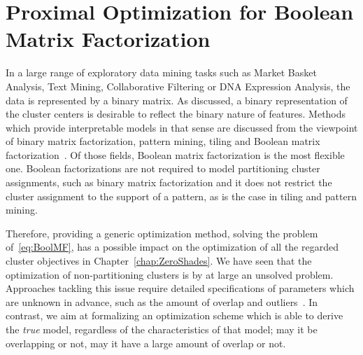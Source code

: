 \chapter{Proximal Optimization for Boolean Matrix Factorization}
\label{chap:PALMB}
In a large range of exploratory data mining tasks such as Market Basket Analysis, Text Mining, Collaborative Filtering or DNA Expression Analysis, the data is represented by a binary matrix. As  discussed, a binary representation of the cluster centers is desirable to reflect the binary nature of features. Methods which provide interpretable models in that sense are discussed from the viewpoint of binary matrix factorization, pattern mining, tiling and Boolean matrix factorization~\citep{tatti2012comparing,zimek2015blind}. Of those fields, Boolean matrix factorization is the most flexible one. Boolean factorizations are not required to model partitioning cluster assignments, such as binary matrix factorization and it does not restrict the cluster assignment to the support of a pattern, as is the case in tiling and pattern mining. 
 
Therefore, providing a generic optimization method, solving the problem of~\ref{eq:BoolMF}, has a possible impact on the optimization of all the regarded cluster objectives in Chapter~\ref{chap:ZeroShades}. We have seen that the optimization of non-partitioning clusters is by at large an unsolved problem. Approaches tackling this issue require detailed specifications of parameters which are unknown in advance, such as the amount of overlap and outliers~\citep{whang2017nonCo}. In contrast, we aim at formalizing an optimization scheme which is able to derive the \emph{true} model, regardless of the characteristics of that model; may it be overlapping or not, may it have a large amount of overlap or not. 

